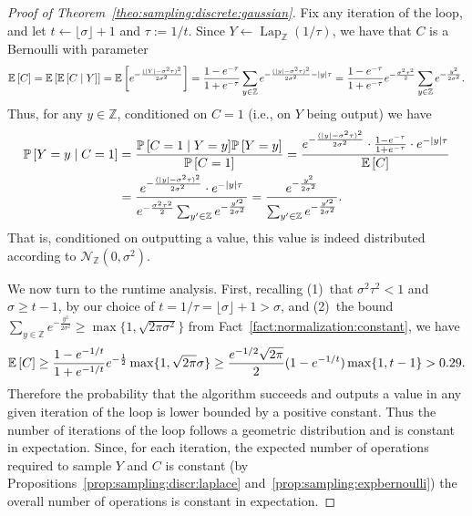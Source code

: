 \documentclass{jpc}
\newcommand{\discL}{\operatorname{Lap}_{\Z}} \newcommand{\discN}{\mathcal{N}_{\Z}}
\newcommand{\dgausss}[2]{{\discN\left(#1,#2\right)}}
\newcommand{\dgauss}[1]{\dgausss{0}{#1}}
\newcommand{\ex}[2]{{\ifx&#1& \mathbb{E} \else
\underset{#1}{\mathbb{E}} \fi \left[#2\right]}}
\newcommand{\pr}[2]{{\ifx&#1& \mathbb{P} \else
\underset{#1}{\mathbb{P}} \fi \left[#2\right]}}
\newcommand{\eqdef}{:=}
\newcommand{\Z}{\mathbb{Z}}
\begin{document}
\begin{proof}[Proof of Theorem~\ref{theo:sampling:discrete:gaussian}]
    Fix any iteration of the loop, and let $t \gets \lfloor \sigma \rfloor+1$ and $\tau\eqdef 1/t$. Since $Y\gets \discL(1/\tau)$, we have that $C$ is a Bernoulli with parameter
    \[
          \ex{}{C} = \ex{}{ \ex{}{C \mid Y} } = \ex{}{ e^{-\frac{(|Y|-\sigma^2\tau)^2}{2\sigma^2}} } = \frac{1-e^{-\tau}}{1+e^{-\tau}} \sum_{y\in\Z} e^{-\frac{(|y|-\sigma^2\tau)^2}{2\sigma^2} - |y|\tau}
          = \frac{1-e^{-\tau}}{1+e^{-\tau}}e^{-\frac{\sigma^2\tau^2}{2}}\sum_{y\in\Z} e^{-\frac{y^2}{2\sigma^2}}.
    \]
    Thus, for any $y\in \Z$, conditioned on $C=1$ (i.e., on $Y$ being output) we have
    \begin{align*}
        \pr{}{ Y=y \mid C=1 } 
        &= \frac{ \pr{}{ C=1 \mid Y=y } \pr{}{Y=y} }{ \pr{}{C=1} }
        = \frac{ e^{-\frac{(|y|-\sigma^2\tau)^2}{2\sigma^2}} \cdot \frac{1-e^{-\tau}}{1+e^{-\tau}}\cdot e^{-|y|\tau} }{ \ex{}{C} }\\
        &= \frac{ e^{-\frac{(|y|-\sigma^2\tau)^2}{2\sigma^2}} \cdot e^{-|y|\tau} }{ e^{-\frac{\sigma^2\tau^2}{2}}\sum_{y'\in\Z} e^{-\frac{y'^2}{2\sigma^2}} }
        = \frac{ e^{-\frac{y^2}{2\sigma^2}} }{\sum_{y'\in\Z} e^{-\frac{y'^2}{2\sigma^2}} }.
    \end{align*}
    That is, conditioned on outputting a value, this value is indeed distributed according to $\dgauss{\sigma^2}$.
    
    We now turn to the runtime analysis. First, recalling (1)~that $\sigma^2\tau^2 < 1$ and $\sigma\ge t-1$, by our choice of $t = 1/\tau = \lfloor \sigma \rfloor + 1 > \sigma$, and (2)~the bound $\sum_{y\in\Z} e^{-\frac{y^2}{2\sigma^2}} \ge \max\{1,\sqrt{2\pi\sigma^2}\}$ from Fact~\ref{fact:normalization:constant}, we have
    $$
    \ex{}{C} \ge \frac{1-e^{-1/t}}{1+e^{-1/t}}e^{-\frac{1}{2}} \max\{1,\sqrt{2\pi}\sigma\} \ge \frac{e^{-1/2} \sqrt{2\pi}}{2} (1-e^{-1/t})\max\{1,t-1\} > 0.29.
    $$
    Therefore the probability that the algorithm succeeds and outputs a value in any given iteration of the loop is lower bounded by a positive constant. Thus the number of iterations of the loop follows a geometric distribution and is constant in expectation. Since, for each iteration, the expected number of operations required to sample $Y$ and $C$ is constant (by Propositions~\ref{prop:sampling:discr:laplace} and~\ref{prop:sampling:expbernoulli}) the overall number of operations is constant in expectation.
\end{proof}
\end{document}
